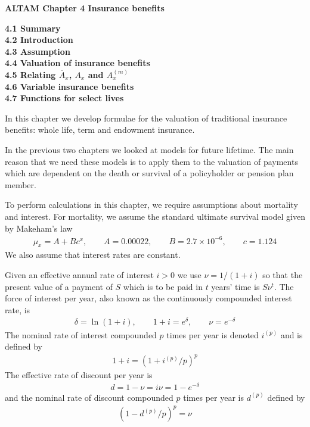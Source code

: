 \documentclass[hidelinks, 12pt]{article}
\theoremstyle{mydefstyle}
\theoremstyle{mythmstyle}
\begin{document}
\textbf{ALTAM Chapter 4 Insurance benefits}

\textbf{4.1 Summary} \\
\textbf{4.2 Introduction} \\
\textbf{4.3 Assumption} \\
\textbf{4.4 Valuation of insurance benefits} \\
\textbf{4.5 Relating $\overline{A}_x$, $A_x$ and $A^{(m)}_x$} \\
\textbf{4.6 Variable insurance benefits} \\
\textbf{4.7 Functions for select lives}

In this chapter we develop formulae for the valuation of traditional insurance benefits: whole life, term and endowment insurance. 

In the previous two chapters we looked at models for future lifetime. The main reason that we need these models is to apply them to the valuation of payments which are dependent on the death or survival of a policyholder or pension plan member. 

To perform calculations in this chapter, we require assumptions about mortality and interest. For mortality, we assume the standard ultimate survival model given by Makeham's law
\begin{gather*}
\mu_x = A + Bc^x, \qquad A = 0.00022, \qquad B = 2.7 \times 10^{-6}, \qquad c = 1.124
\end{gather*}
We also assume that interest rates are constant. 

Given an effective annual rate of interest $i > 0$ we use $\nu = 1/(1+i)$ so that the present value of a payment of $S$ which is to be paid in $t$ years' time is $S\nu^t$. The force of interest per year, also known as the continuously compounded interest rate, is
\begin{gather*}
\delta = \ln(1+i), \qquad 1+i = e^{\delta}, \qquad \nu = e^{-\delta}
\end{gather*}
The nominal rate of interest compounded $p$ times per year is denoted $i^{(p)}$ and is defined by
\begin{gather*}
1+ i = (1+i^{(p)}/p)^p
\end{gather*}
The effective rate of discount per year is
\begin{gather*}
d = 1 - \nu = i\nu = 1 - e^{-\delta}
\end{gather*}
and the nominal rate of discount compounded $p$ times per year is $d^{(p)}$ defined by
\begin{gather*}
(1-d^{(p)}/p)^p = \nu
\end{gather*}
\end{document}
